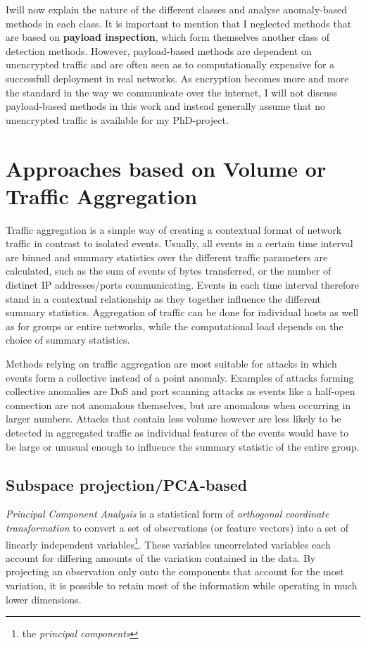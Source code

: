 \documentclass[a4paper,12pt,twoside]{report}
\begin{document}
Iwill now explain the nature of the different classes and analyse anomaly-based methods in each class. It is important to mention that I neglected methods that are based on \textbf{payload inspection}, which form themselves another class of detection methods. However, payload-based methods are dependent on unencrypted traffic and are often seen as to computationally expensive for a successfull deployment in real networks. As encryption becomes more and more the standard in the way we communicate over the internet, I will not discuss payload-based methods in this work and instead generally assume that no unencrypted traffic is available for my PhD-project.

\section{Approaches based on Volume or Traffic Aggregation}

Traffic aggregation is a simple way of creating a contextual format of network traffic in contrast to isolated events. Usually, all events in a certain time interval are binned and summary statistics over the different traffic parameters are calculated, such as the sum of events of bytes transferred, or the number of distinct IP addresses/ports communicating. Events in each time interval therefore stand in a contextual relationship as they together influence the different summary statistics.  Aggregation of traffic can be done for individual hosts as well as for groups or entire networks, while the computational load depends on the choice of summary statistics. 

Methods relying on traffic aggregation are most suitable for attacks in which events form a collective instead of a point anomaly. Examples  of attacks forming collective anomalies are DoS and port scanning attacks as events like a half-open connection are not anomalous themselves, but are anomalous when occurring in larger numbers. Attacks that contain less volume however are less likely to be detected in aggregated traffic as individual features of the events would have to be large or unusual enough to influence the summary statistic of the entire group.


\subsection{Subspace projection/PCA-based}

\textit{Principal Component Analysis} is a statistical form of \textit{orthogonal coordinate transformation} to convert a set of observations (or feature vectors) into a set of linearly independent variables\footnote{the \textit{principal components}}. These variables uncorrelated variables each account for differing amounts of the variation contained in the data. By projecting an observation only onto the components that account for the most variation, it is possible to retain most of the information while operating in much lower dimensions.
\end{document}
